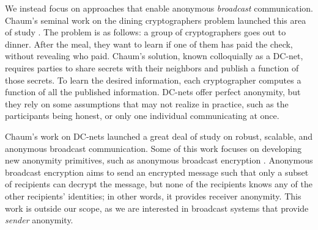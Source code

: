 We instead focus on approaches that enable anonymous \emph{broadcast} communication.
Chaum's seminal work on the dining cryptographers problem launched this area of study \cite{chaum88}.
The problem is as follows: a group of cryptographers goes out to dinner. After the meal, they want to learn if one of them has paid the check, without revealing who paid.
Chaum's solution, known colloquially as a DC-net, requires parties to share secrets with their neighbors and publish a function of those secrets. %
To learn the desired information, each cryptographer computes a function of all the published information. %
DC-nets offer perfect anonymity, but they rely on some assumptions that may not realize in practice, such as the participants being honest, or only one individual communicating at once.

Chaum's work on DC-nets launched a great deal of study on robust, scalable, and anonymous broadcast communication. 
Some of this work focuses on developing new anonymity primitives, such as anonymous broadcast encryption \cite{libert2012anonymous, fazio2012outsider}.
Anonymous broadcast encryption aims to send an encrypted message such that only a subset of recipients can decrypt the message, but none of the recipients knows any of the other recipients' identities; in other words, it provides receiver anonymity.
This work is outside our scope, as we are interested in broadcast systems that provide \emph{sender} anonymity.


